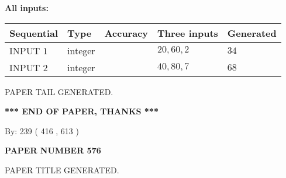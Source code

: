 \documentclass[12pt]{article}
\begin{document}
   
   
   
\noindent\vspace{0.1in}\hspace{-0.08in} {\textbf{\Large{All inputs: }}}
   
   
  
  
\noindent\begin{tabular}{|l|l|l|l|l|}
\hline
 Sequential & Type & Accuracy & Three inputs & Generated \\ 
\hline
 
 
  INPUT $  1 $ & integer &  & $
 20
 , 
 60
 , 
 2
 $ & $ 34 $ 
 \\  \hline  
 
 
  INPUT $  2 $ & integer &  & $
 40
 , 
 80
 , 
 7
 $ & $ 68 $ 
 \\  \hline  
 \end{tabular}
   
   
   
   
   
   
 \vspace{0.2in}
 
   
   
\vspace{2.0in} PAPER TAIL GENERATED.
   
   
   
   
\vspace{1.0in} 
{\textbf{\large{ *** END OF PAPER, THANKS *** }}} 
   
   
\hspace{1.0in} By: 
 239 ( 416 ,  613 )
   
   
   
   
\newpage 
\setcounter{page}{ 
   576001 } 
   
   
   
   
 {\textbf{ \Large{ PAPER NUMBER  576  }}}
   
   
\vspace{0.2in}
   
   
   
   
   
   
   
   
 \vspace{0.2in}
 
 
 
 
   
   
 PAPER TITLE GENERATED.
   
   
   
\vspace{0.2in}
   
\end{document}
